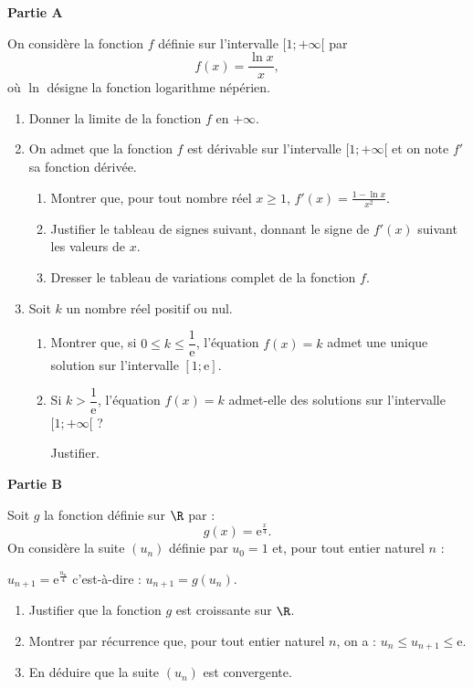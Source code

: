 \textbf{Partie A}

\medskip

On considère la fonction $f$ définie sur l'intervalle $[1;+\infty[$ par \[f(x) = \dfrac{\ln x}{x},\] où $\ln$ désigne la fonction logarithme népérien.
%
\begin{enumerate}
	\item Donner la limite de la fonction $f$ en $+\infty$.
	\item On admet que la fonction $f$ est dérivable sur l'intervalle $[1;+\infty[$ et on note $f'$ sa fonction dérivée.
	\begin{enumerate}
		\item Montrer que, pour tout nombre réel $x \geqslant 1$, $f'(x) = \frac{1 - \ln x}{x^2}$.
		\item Justifier le tableau de signes suivant, donnant le signe de $f'(x)$ suivant les valeurs de $x$.
		\begin{center}
		\end{center}
		\item Dresser le tableau de variations complet de la fonction $f$.
	\end{enumerate}
	\item Soit $k$ un nombre réel positif ou nul.
	\begin{enumerate}
		\item Montrer que, si $0 \leqslant k \leqslant \dfrac{1}{\text{e}}$, l'équation $f(x) = k$ admet une unique solution sur l'intervalle $[1;\text{e}]$.
		\item Si $k > \dfrac{1}{\text{e}}$, l'équation $f(x) = k$ admet-elle des solutions sur l'intervalle $[1;+\infty[$ ?
		
		Justifier.
	\end{enumerate}
\end{enumerate}

\textbf{Partie B}

\medskip

Soit $g$ la fonction définie sur $\R$ par : \[g(x) = \text{e}^{\frac{x}{4}}.\]
%
On considère la suite $\left(u_n\right)$ définie par $u_0 = 1$ et, pour tout entier naturel $n$ :

\hfill$u_{n+1} = \text{e}^{\frac{u_n}{4}}$ c'est-à-dire : $u_{n+1} = g\left(u_n\right)$.\hfill~
%
\begin{enumerate}
	\item Justifier que la fonction $g$ est croissante sur $\R$.
	\item Montrer par récurrence que, pour tout entier naturel $n$, on a : $u_n \leqslant  u_{n+1} \leqslant \text{e}$.
	\item En déduire que la suite $\left(u_n\right)$ est convergente.
\end{enumerate}


